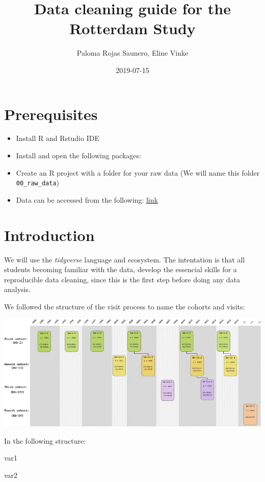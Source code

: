 \documentclass[]{book}
\title{Data cleaning guide for the Rotterdam Study}
\author{Paloma Rojas Saunero, Eline Vinke}
\date{2019-07-15}
\begin{document}
\maketitle

{
\setcounter{tocdepth}{1}
\tableofcontents
}
\hypertarget{prerequisites}{%
\chapter{Prerequisites}\label{prerequisites}}

\begin{itemize}
\item
  Install R and Rstudio IDE
\item
  Install and open the following packages:
\item
  Create an R project with a folder for your raw data (We will name this folder \texttt{00\_raw\_data})
\item
  Data can be accessed from the following: \href{https://epi-wiki.erasmusmc.nl/wiki/ergowiki/index.php/Ergobasics}{link}
\end{itemize}

\hypertarget{intro}{%
\chapter{Introduction}\label{intro}}

We will use the \emph{tidyverse} language and ecosystem.
The intentation is that all students becoming familiar with the data, develop the essencial skills for a reproducible data cleaning, since this is the first step before doing any data analysis.

We followed the structure of the visit process to name the cohorts and visits:

\includegraphics[width=11.28in]{./rs}

In the following structure:

var1

var2
\end{document}
